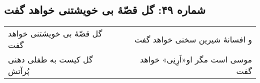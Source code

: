 \begin{center}
\section*{شماره ۴۹: گل قصّۀ بی خویشتنی خواهد گفت}
\label{sec:049}
\begin{longtable}{l p{0.5cm} r}
گل قصّهٔ بی خویشتنی خواهد گفت
&&
و افسانهٔ شیرین سخنی خواهد گفت
\\
گل کیست به طفلی دهنی پُرآتش
&&
موسی است مگر او«اَرِنِی» خواهد گفت
\\
\end{longtable}
\end{center}
